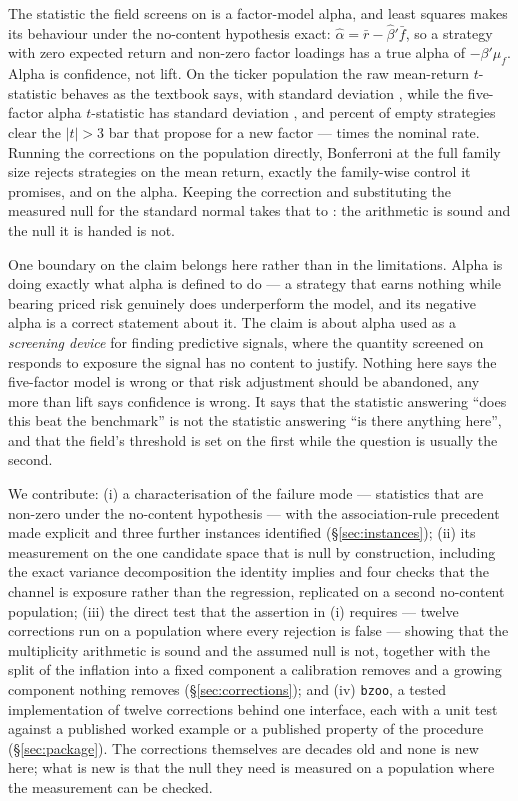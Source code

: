 \documentclass{article}
\begin{document}
The statistic the field screens on is a factor-model alpha, and least squares
makes its behaviour under the no-content hypothesis exact:
$\hat\alpha = \bar r - \hat\beta'\bar f$, so a strategy with zero expected
return and non-zero factor loadings has a true alpha of $-\beta'\mu_f$. Alpha
is confidence, not lift. On the ticker population the raw mean-return
$t$-statistic behaves as the textbook says, with standard deviation
\bzoonullMeanSdVw{}, while the five-factor alpha $t$-statistic has standard
deviation \bzoonullFfSdVw{}, and \bzooamThreeFfFiveVwPct{} percent of empty
strategies clear the $|t| > 3$ bar that \citet{harvey2016} propose for a new
factor --- \bzooamTimesNominal{} times the nominal rate. Running the
corrections on the population directly, Bonferroni at the full family size
rejects \bzooamBonfFalseMean{} strategies on the mean return, exactly the
family-wise control it promises, and \bzooamBonfFalseAlpha{} on the alpha.
Keeping the correction and substituting the measured null for the standard
normal takes that to \bzooamMeasuredBonfFalse{}: the arithmetic is sound and
the null it is handed is not.

One boundary on the claim belongs here rather than in the limitations. Alpha is
doing exactly what alpha is defined to do --- a strategy that earns nothing
while bearing priced risk genuinely does underperform the model, and its
negative alpha is a correct statement about it. The claim is about alpha used
as a \emph{screening device} for finding predictive signals, where the quantity
screened on responds to exposure the signal has no content to justify. Nothing
here says the five-factor model is wrong or that risk adjustment should be
abandoned, any more than lift says confidence is wrong. It says that the
statistic answering ``does this beat the benchmark'' is not the statistic
answering ``is there anything here'', and that the field's threshold is set on
the first while the question is usually the second.

We contribute: (i) a characterisation of the failure mode --- statistics that
are non-zero under the no-content hypothesis --- with the association-rule
precedent made explicit and three further instances identified
(\S\ref{sec:instances}); (ii) its measurement on the one candidate space that
is null by construction, including the exact variance decomposition the
identity implies and four checks that the channel is exposure rather than the
regression, replicated on a second no-content population;
(iii) the direct test that the assertion in (i) requires --- twelve
corrections run on a population where every rejection is false --- showing that
the multiplicity arithmetic is sound and the assumed null is not, together
with the split of the inflation into a fixed component a calibration removes
and a growing component nothing removes (\S\ref{sec:corrections});
and (iv) \texttt{bzoo}, a tested implementation of twelve corrections behind
one interface, each with a unit test against a published worked example or a
published property of the procedure (\S\ref{sec:package}). The corrections
themselves are decades old and none is new here; what is new is that the null
they need is measured on a population where the measurement can be checked.
\end{document}
